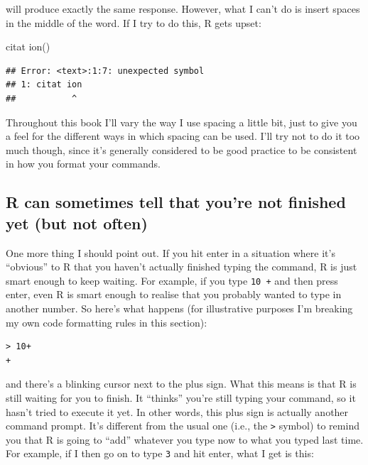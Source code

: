 \documentclass[
]{book}
\newenvironment{Shaded}{\begin{snugshade}}{\end{snugshade}}
\newcommand{\FunctionTok}[1]{\textcolor[rgb]{0.00,0.00,0.00}{#1}}
\newcommand{\NormalTok}[1]{#1}
\begin{document}
will produce exactly the same response. However, what I can't do is insert spaces in the middle of the word. If I try to do this, R gets upset:

\begin{Shaded}
\begin{Highlighting}[]
\NormalTok{citat }\FunctionTok{ion}\NormalTok{()}
\end{Highlighting}
\end{Shaded}

\begin{verbatim}
## Error: <text>:1:7: unexpected symbol
## 1: citat ion
##           ^
\end{verbatim}

Throughout this book I'll vary the way I use spacing a little bit, just to give you a feel for the different ways in which spacing can be used. I'll try not to do it too much though, since it's generally considered to be good practice to be consistent in how you format your commands.

\hypertarget{r-can-sometimes-tell-that-youre-not-finished-yet-but-not-often}{%
\subsection{R can sometimes tell that you're not finished yet (but not often)}\label{r-can-sometimes-tell-that-youre-not-finished-yet-but-not-often}}

One more thing I should point out. If you hit enter in a situation where it's ``obvious'' to R that you haven't actually finished typing the command, R is just smart enough to keep waiting. For example, if you type \texttt{10\ +} and then press enter, even R is smart enough to realise that you probably wanted to type in another number. So here's what happens (for illustrative purposes I'm breaking my own code formatting rules in this section):

\begin{verbatim}
> 10+
+ 
\end{verbatim}

and there's a blinking cursor next to the plus sign. What this means is that R is still waiting for you to finish. It ``thinks'' you're still typing your command, so it hasn't tried to execute it yet. In other words, this plus sign is actually another command prompt. It's different from the usual one (i.e., the \texttt{\textgreater{}} symbol) to remind you that R is going to ``add'' whatever you type now to what you typed last time. For example, if I then go on to type \texttt{3} and hit enter, what I get is this:
\end{document}

